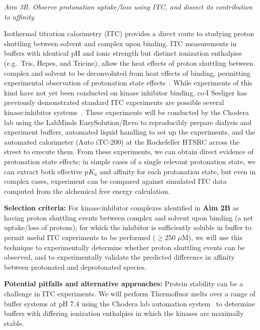 \documentclass[11pt]{article}
\begin{document}
\emph{Aim 3B. Observe protonation uptake/loss using ITC, and dissect its contribution to affinity}

Isothermal titration calorimetry (ITC) provides a direct route to studying proton shuttling between solvent and complex upon binding.
ITC measurements in buffers with identical pH and ionic strength but distinct ionization enthalpies (e.g.~Tris, Hepes, and Tricine), allow the heat effects of proton shuttling between complex and solvent to be deconvoluted from heat effects of binding, permitting experimental observation of protonation state effects~\cite{baker-murphy:biophys-j:1996:protonation-events-itc}.
While experiments of this kind have not yet been conducted on kinase inhibitor binding, co-I Seeliger has previously demonstrated standard ITC experiments are possible several kinase:inhibitor systems~\cite{seeliger:2007:structure:imatinib-binding}.
These experiments will be conducted by the Chodera lab using the LabMinds EasySolution/Revo to reproducibly prepare dialysis and experiment buffers, automated liquid handling to set up the experiments, and the automated calorimeter (Auto iTC-200) at the Rockefeller HTSRC across the street to execute them.
From these experiments, we can obtain direct evidence of protonation state effects; in simple cases of a single relevant protonation state, we can extract both effective p$K_a$ and affinity for each protonation state, but even in complex cases, experiment can be compared against simulated ITC data computed from the alchemical free energy calculation.

{\bf Selection criteria:}
For kinase:inhibitor complexes identified in {\bf Aim 2B} as having proton shuttling events between complex and solvent upon binding (a net uptake/loss of protons), for which the inhibitor is sufficiently soluble in buffer to permit useful ITC experiments to be performed ($\ge$250 $\mu$M), we will use this technique to experimentally determine whether proton shuttling events can be observed, and to experimentally validate the predicted difference in affinity between protonated and deprotonated species.

{\bf Potential pitfalls and alternative approaches:} 
Protein stability can be a challenge in ITC experiments.
We will perform Thermofluor melts over a range of buffer systems at pH 7.4 using the Chodera lab automation system~\cite{magliery:jacs:2009:thermofluor} to determine buffers with differing ionization enthalpies in which the kinases are maximally stable.
\end{document}
